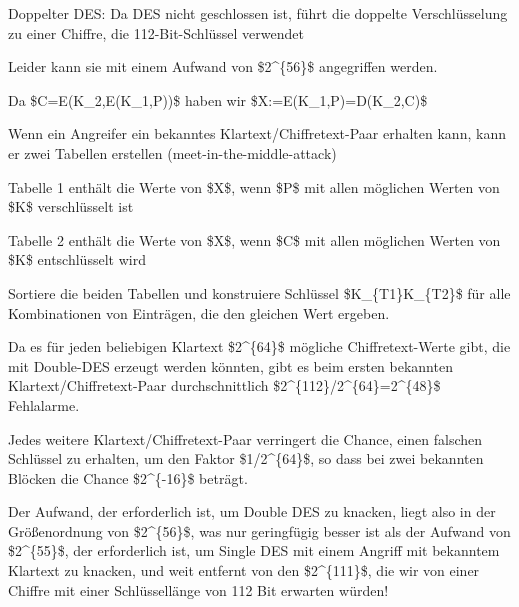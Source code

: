 \documentclass[a4paper]{article}
\begin{document}
\begin{multicols}{3}
      \begin{itemize*}
            \item Doppelter DES: Da DES nicht geschlossen ist, führt die doppelte
            Verschlüsselung zu einer Chiffre, die 112-Bit-Schlüssel verwendet
            \begin{itemize*}
                  \item Leider kann sie mit einem Aufwand von \$2\^{}\{56\}\$ angegriffen werden.
                  \item Da \$C=E(K\_2,E(K\_1,P))\$ haben wir \$X:=E(K\_1,P)=D(K\_2,C)\$
                  \item Wenn ein Angreifer ein bekanntes Klartext/Chiffretext-Paar erhalten kann, kann er zwei Tabellen erstellen (meet-in-the-middle-attack)
                  \begin{itemize*} \item Tabelle 1 enthält die Werte von \$X\$, wenn \$P\$ mit allen möglichen Werten von \$K\$ verschlüsselt ist \item Tabelle 2 enthält die Werte von \$X\$, wenn \$C\$ mit allen möglichen Werten von \$K\$ entschlüsselt wird \item Sortiere die beiden Tabellen und konstruiere Schlüssel \$K\_\{T1\}\textbar\textbar K\_\{T2\}\$ für alle Kombinationen von Einträgen, die den gleichen Wert ergeben. \end{itemize*}
            \end{itemize*}
            \item Da es für jeden beliebigen Klartext \$2\^{}\{64\}\$ mögliche
            Chiffretext-Werte gibt, die mit Double-DES erzeugt werden könnten,
            gibt es beim ersten bekannten Klartext/Chiffretext-Paar
            durchschnittlich \$2\^{}\{112\}/2\^{}\{64\}=2\^{}\{48\}\$ Fehlalarme.
            \item Jedes weitere Klartext/Chiffretext-Paar verringert die Chance, einen
            falschen Schlüssel zu erhalten, um den Faktor \$1/2\^{}\{64\}\$, so
            dass bei zwei bekannten Blöcken die Chance \$2\^{}\{-16\}\$ beträgt.
            \item Der Aufwand, der erforderlich ist, um Double DES zu knacken, liegt
            also in der Größenordnung von \$2\^{}\{56\}\$, was nur geringfügig
            besser ist als der Aufwand von \$2\^{}\{55\}\$, der erforderlich ist,
            um Single DES mit einem Angriff mit bekanntem Klartext zu knacken, und
            weit entfernt von den \$2\^{}\{111\}\$, die wir von einer Chiffre mit
            einer Schlüssellänge von 112 Bit erwarten würden!

\end{itemize*}
\end{multicols}
\end{document}
